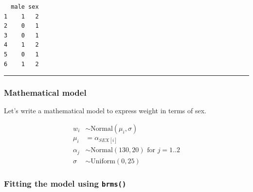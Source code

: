 \documentclass[
  letterpaper,
  DIV=11,
  numbers=noendperiod]{scrartcl}
\begin{document}
\begin{verbatim}
  male sex
1    1   2
2    0   1
3    0   1
4    1   2
5    0   1
6    1   2
\end{verbatim}

\begin{center}\rule{0.5\linewidth}{0.5pt}\end{center}

\subsubsection{Mathematical model}\label{mathematical-model}

Let's write a mathematical model to express weight in terms of sex.

\begin{align*}
w_i &\sim \text{Normal}(\mu_i, \sigma) \\
\mu_i &=     \alpha_{SEX[i]} \\
\alpha_j &\sim \text{Normal}(130, 20)\text{ for }j = 1..2 \\
\sigma &\sim \text{Uniform}(0, 25)
\end{align*}

\subsubsection{\texorpdfstring{Fitting the model using
\texttt{brms()}}{Fitting the model using brms()}}\label{fitting-the-model-using-brms}
\end{document}
